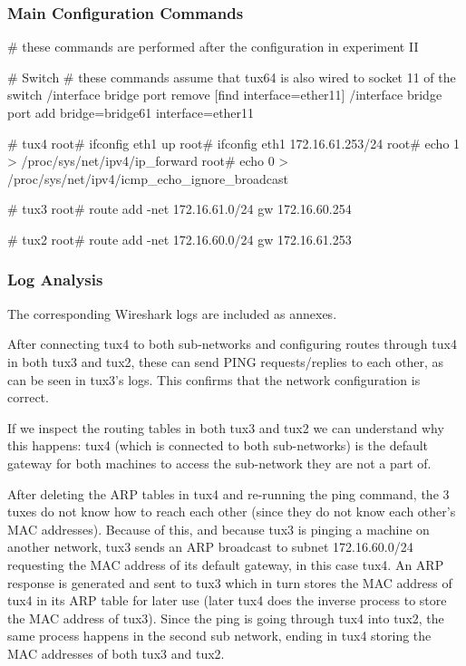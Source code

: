 \documentclass[11pt,a4paper,twocolumn]{article}
\begin{document}
\subsubsection{Main Configuration Commands}

\begin{code-bash}
# these commands are performed after the configuration in experiment II

# Switch
# these commands assume that tux64 is also wired to socket 11 of the switch
/interface bridge port remove [find interface=ether11]
/interface bridge port add bridge=bridge61 interface=ether11

# tux4
root# ifconfig eth1 up
root# ifconfig eth1 172.16.61.253/24
root# echo 1 > /proc/sys/net/ipv4/ip_forward
root# echo 0 > /proc/sys/net/ipv4/icmp_echo_ignore_broadcast

# tux3
root# route add -net 172.16.61.0/24 gw 172.16.60.254

# tux2
root# route add -net 172.16.60.0/24 gw 172.16.61.253
\end{code-bash}

\subsubsection{Log Analysis}

The corresponding Wireshark logs are included as annexes.

After connecting tux4 to both sub-networks and configuring routes through tux4 in both tux3 and tux2, these can send PING requests/replies to each other, as can be seen in tux3's logs. This confirms that the network configuration is correct.

If we inspect the routing tables in both tux3 and tux2 we can understand why this happens: tux4 (which is connected to both sub-networks) is the default gateway for both machines to access the sub-network they are not a part of.

After deleting the ARP tables in tux4 and re-running the ping command, the 3 tuxes do not know how to reach each other (since they do not know each other's MAC addresses).
Because of this, and because tux3 is pinging a machine on another network, tux3 sends an ARP broadcast to subnet 172.16.60.0/24 requesting the MAC address of its default gateway, in this case tux4.
An ARP response is generated and sent to tux3 which in turn stores the MAC address of tux4 in its ARP table for later use (later tux4 does the inverse process to store the MAC address of tux3).
Since the ping is going through tux4 into tux2, the same process happens in the second sub network, ending in tux4 storing the MAC addresses of both tux3 and tux2.
\end{document}
